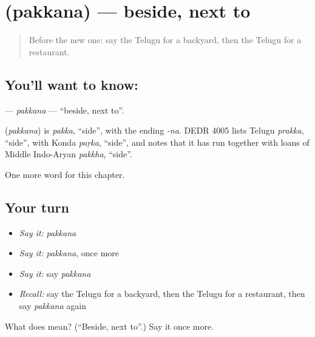 \section[\texorpdfstring{\te{పక్కన} (pakkana)}{పక్కన (pakkana)}]{ (pakkana) — beside, next to}

\label{lesson:TE-C173-pakkana}



\begin{quote}
Before the new one: say the Telugu for a backyard, then the Telugu for a restaurant.
\end{quote}

\subsection*{You'll want to know: }
\textbf{} — \emph{pakkana} — \textquotedblleft{}beside, next to\textquotedblright{}.

\begin{cousinweb}
\textbf{} (\emph{pakkana}) is \emph{pakka}, \textquotedblleft{}side\textquotedblright{}, with the ending \emph{-na}. DEDR 4005 lists Telugu \emph{prakka}, \textquotedblleft{}side\textquotedblright{}, with Konda \emph{paṛka}, \textquotedblleft{}side\textquotedblright{}, and notes that it has run together with loans of Middle Indo-Aryan \emph{pakkha}, \textquotedblleft{}side\textquotedblright{}.
\end{cousinweb}

\begin{grammarlens}[title={What you've built}]
One more word for this chapter.
\end{grammarlens}

\subsection*{Your turn}
\begin{itemize}
\raggedright
  \item \emph{Say it:} \emph{pakkana}
  \item \emph{Say it:} \emph{pakkana}, once more
  \item \emph{Say it:} say \emph{pakkana}
  \item \emph{Recall:} say the Telugu for a backyard, then the Telugu for a restaurant, then say \emph{pakkana} again
\end{itemize}

\begin{tcolorbox}[breakable,colback=teal!4,colframe=teal!35!black,title={Before you move on}]
What does  mean? (\textquotedblleft{}Beside, next to\textquotedblright{}.) Say it once more.
\end{tcolorbox}
